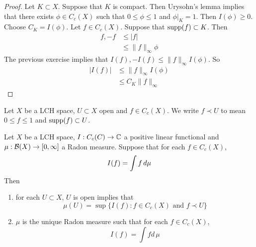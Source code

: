 \documentclass{book}
\begin{document}
	\begin{proof}
		Let $K \subset X$. Suppose that $K$ is compact. Then Urysohn's lemma implies that there exists $\phi \in C_c(X)$ such that $0 \leq \phi \leq 1$ and $\phi|_K = 1$. Then $I(\phi) \geq 0$. Choose $C_K = I(\phi)$. Let $f \in C_c(X)$. Suppose that $\operatorname{supp}(f) \subset K$. Then 
		\begin{align*}
			f,-f 
			&\leq |f| \\
			& \leq \|f\|_{\infty} \phi
		\end{align*}
		The previous exercise implies that $I(f), -I(f) \leq \|f\|_{\infty} I(\phi)$. So 
		\begin{align*}
			|I(f)| 
			&\leq \|f\|_{\infty} I(\phi) \\
			&\leq  C_K \|f\|_{\infty}  
		\end{align*}
	\end{proof}
	
	\begin{note}
		Let $X$ be a LCH space, $U \subset X$ open and $f \in C_c(X)$. We write $f \prec U$ to mean $0 \leq f \leq 1$ and $\operatorname{supp}(f) \subset U$. 
	\end{note}
	
	\begin{ex}  
		Let $X$ be a LCH space, $I: C_c(C) \rightarrow \mathbb{C}$ a positive linear functional and $\mu:\mathcal{B}(X) \rightarrow [0,\infty]$ a Radon measure. Suppose that for each $f \in C_c(X)$, $$I(f) = \int f \, d \mu$$
		Then 
		\begin{enumerate}
			\item for each $U \subset X$, $U$ is open implies that $$\mu(U) = \sup \{I(f): f \in C_c(X) \text{ and } f \prec U \}$$ 
			\item $\mu$ is the unique Radon measure such that for each $f \in C_c(X)$, $$I(f) = \int f d \, \mu$$
		\end{enumerate}	 
	\end{ex}
	
\end{document}
